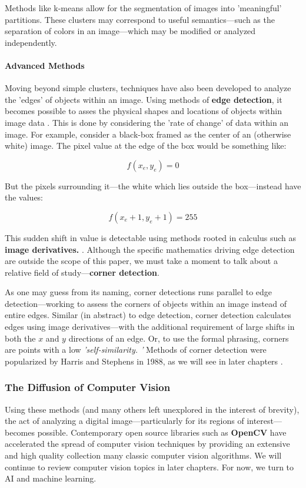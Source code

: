 \documentclass{report}
\newcommand{\tech}[1]{\textbf{#1}}
\begin{document}
Methods like k-means allow for the segmentation of images into 'meaningful' partitions. These clusters may correspond to useful semantics---such as the separation of colors in an image---which may be modified or analyzed independently.

\paragraph{Advanced Methods} Moving beyond simple clusters, techniques have also been developed to analyze the 'edges' of objects within an image. Using methods of \tech{edge detection}, it becomes possible to asses the physical shapes and locations of objects within image data \cite{ziou1998edge}. This is done by considering the 'rate of change' of data within an image. For example, consider a black-box framed as the center of an (otherwise white) image. The pixel value at the edge of the box would be something like:

$$f(x_{e}, y_{e}) = 0$$ 

But the pixels surrounding it---the white which lies outside the box---instead have the values:

$$
f(x_e + 1, y_e + 1) = 255
$$

This sudden shift in value is detectable using methods rooted in calculus such as \tech{image derivatives.} \cite{hashimoto1987multiple}. Although the specific mathematics driving edge detection are outside the scope of this paper, we must take a moment to talk about a relative field of study---\tech{corner detection}. 

As one may guess from its naming, corner detections runs parallel to edge detection---working to assess the corners of objects within an image instead of entire edges. Similar (in abstract) to edge detection, corner detection calculates edges using image derivatives---with the additional requirement of large shifts in both the $x$ and $y$ directions of an edge. Or, to use the formal phrasing, corners are points with a low \emph{'self-similarity. \cite{maver2009self}'} Methods of corner detection were popularized by Harris and Stephens in 1988, as we will see in later chapters \cite{Harris}. 

\subsubsection{The Diffusion of Computer Vision}

Using these methods (and many others left unexplored in the interest of brevity), the act of analyzing a digital image---particularly for its regions of interest---becomes possible. Contemporary open source libraries such as \tech{OpenCV} \cite{opencv_library} have accelerated the spread of computer vision techniques by providing an extensive and high quality collection many classic computer vision algorithms. We will continue to review computer vision topics in later chapters. For now, we turn to AI and machine learning. 
\end{document}

